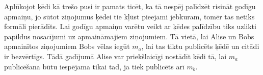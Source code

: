 Aplūkojot ķēdi kā trešo pusi ir pamats ticēt, ka tā nespēj palīdzēt risināt godīgu apmaiņu, jo sūtot ziņojumus ķēdei tie kļūst pieejami jebkuram, tomēr tas netiks formāli pierādīts. Lai godīgu apmaiņu varētu veikt ar ķēdes palīdzību tiks uzlikti papildus nosacījumi uz apmaināmajiem ziņojumiem. Tā vietā, lai Alise un Bobs apmainītos ziņojumiem Bobs vēlas iegūt $m_a$, lai tas tiktu publicēts ķēdē un citādi ir bezvērtīgs. Tādā gadījumā Alise var priekšlaicīgi nostādīt ķēdi tā, lai $m_a$ publicēšana būtu iespējama tikai tad, ja tiek publicēts arī $m_b$.
